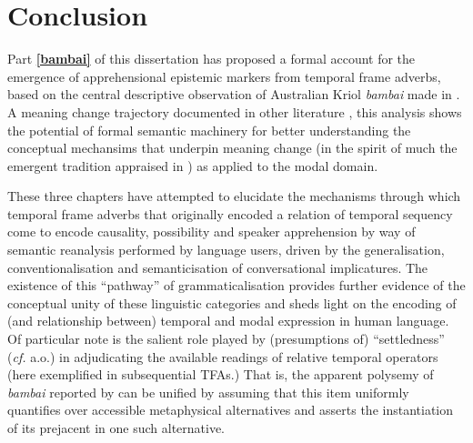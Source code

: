 \section{Conclusion}\label{bambai.concl}

Part \textbf{\ref{bambai}} of this dissertation has proposed a formal account for the emergence of apprehensional epistemic markers from temporal frame adverbs, based on the central descriptive observation of Australian Kriol \textit{bambai} made in \cite{Angelo2016}. A meaning change trajectory documented in other literature \citep{Kuteva2019a,Kuteva2019,Angelo2018}, this analysis shows the potential of formal semantic machinery for better understanding the conceptual mechansims that underpin  meaning change (in the spirit of much the emergent tradition appraised in \citealt{Deo2015}) as applied to the modal domain. %


These three chapters have attempted to elucidate the mechanisms through which temporal frame adverbs that originally encoded a relation of temporal sequency come to encode causality, possibility and speaker apprehension by way of semantic reanalysis performed by language users, driven by the generalisation, conventionalisation and semanticisation of conversational implicatures. The existence of this ``pathway'' of grammaticalisation provides further evidence of the conceptual unity of these linguistic categories and sheds light on the encoding of (and relationship between) temporal and modal expression in human language. Of particular note is the salient role played by (presumptions of) ``settledness'' (\textit{cf.} \citealp{Condoravdi2002,Kaufmann2005} a.o.) in adjudicating the available readings of relative temporal operators (here exemplified in subsequential TFAs.) That is, the apparent polysemy of \textit{bambai} reported by \citet{Angelo2016} can be unified by assuming that this item uniformly quantifies over accessible metaphysical  alternatives and asserts the instantiation of its prejacent in one such alternative.

